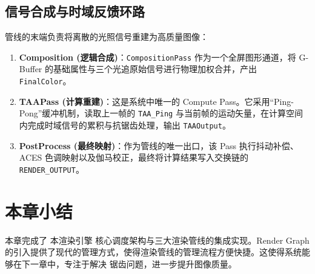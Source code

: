 \subsection{信号合成与时域反馈环路}
管线的末端负责将离散的光照信号重建为高质量图像：
\begin{enumerate}
    \item \textbf{Composition (逻辑合成)}：\texttt{CompositionPass} 作为一个全屏图形通道，将 G-Buffer 的基础属性与三个光追原始信号进行物理加权合并，产出 \texttt{FinalColor}。
    \item \textbf{TAAPass (计算重建)}：这是系统中唯一的 Compute Pass。它采用“Ping-Pong”缓冲机制，读取上一帧的 \texttt{TAA\_Ping} 与当前帧的运动矢量，在计算空间内完成时域信号的累积与抗锯齿处理，输出 \texttt{TAAOutput}。
    \item \textbf{PostProcess (最终映射)}：作为管线的唯一出口，该 Pass 执行抖动补偿、ACES 色调映射以及伽马校正，最终将计算结果写入交换链的 \texttt{RENDER\_OUTPUT}。
\end{enumerate}

\section{本章小结}
本章完成了 本渲染引擎 核心调度架构与三大渲染管线的集成实现。Render Graph 的引入提供了现代的管理方式，使得渲染管线的管理流程方便快捷。这使得系统能够在下一章中，专注于解决 锯齿问题，进一步提升图像质量。

